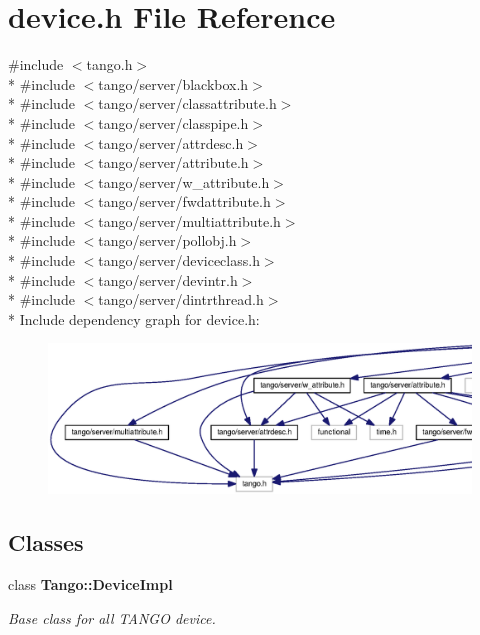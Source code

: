 \section{device.\-h File Reference}
\label{device_8h}
{\ttfamily \#include $<$tango.\-h$>$}\\*
{\ttfamily \#include $<$tango/server/blackbox.\-h$>$}\\*
{\ttfamily \#include $<$tango/server/classattribute.\-h$>$}\\*
{\ttfamily \#include $<$tango/server/classpipe.\-h$>$}\\*
{\ttfamily \#include $<$tango/server/attrdesc.\-h$>$}\\*
{\ttfamily \#include $<$tango/server/attribute.\-h$>$}\\*
{\ttfamily \#include $<$tango/server/w\-\_\-attribute.\-h$>$}\\*
{\ttfamily \#include $<$tango/server/fwdattribute.\-h$>$}\\*
{\ttfamily \#include $<$tango/server/multiattribute.\-h$>$}\\*
{\ttfamily \#include $<$tango/server/pollobj.\-h$>$}\\*
{\ttfamily \#include $<$tango/server/deviceclass.\-h$>$}\\*
{\ttfamily \#include $<$tango/server/devintr.\-h$>$}\\*
{\ttfamily \#include $<$tango/server/dintrthread.\-h$>$}\\*
Include dependency graph for device.\-h\-:
\nopagebreak
\begin{figure}[H]
\begin{center}
\leavevmode
\includegraphics[width=350pt]{d5/d97/device_8h__incl}
\end{center}
\end{figure}
\subsection*{Classes}
\begin{DoxyCompactItemize}
\item 
class {\bf Tango\-::\-Device\-Impl}
\begin{DoxyCompactList}\small\item\em Base class for all T\-A\-N\-G\-O device. \end{DoxyCompactList}\end{DoxyCompactItemize}
